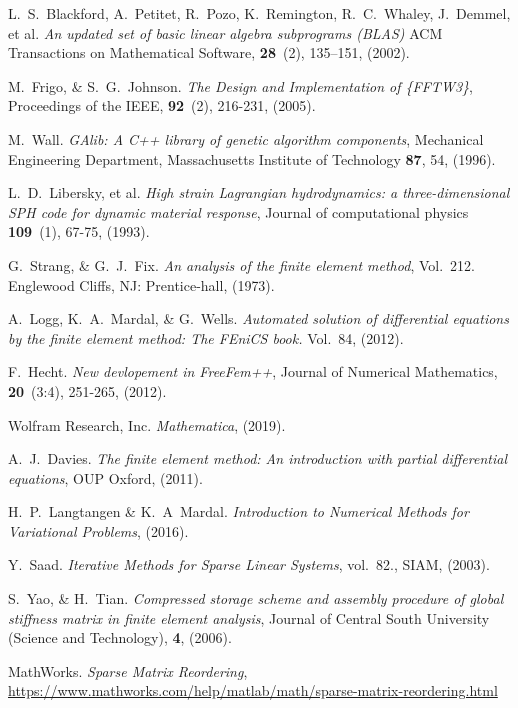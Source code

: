 \clearpage
\thispagestyle{empty}

\begin{thebibliography}{99}

 L.~S.~Blackford, A.~Petitet, R.~Pozo, K.~Remington, R.~C.~Whaley, J.~Demmel, et al. {\em An updated set of basic linear algebra subprograms (BLAS)} ACM Transactions on Mathematical Software, \textbf{28}~(2), 135–151, (2002).

 M.~Frigo, \& S.~G.~Johnson. {\em The Design and Implementation of \{FFTW3\}}, Proceedings of the IEEE, \textbf{92}~(2), 216-231, (2005).

 M.~Wall. {\em GAlib: A C++ library of genetic algorithm components},  Mechanical Engineering Department, Massachusetts Institute of Technology \textbf{87}, 54, (1996).

 L.~D.~Libersky, et al. {\em High strain Lagrangian hydrodynamics: a three-dimensional SPH code for dynamic material response}, Journal of computational physics \textbf{109}~(1), 67-75, (1993).

 G.~Strang, \& G.~J.~Fix. {\em An analysis of the finite element method}, Vol.~212. Englewood Cliffs, NJ: Prentice-hall, (1973).

 A.~Logg, K.~A.~Mardal, \& G.~Wells. {\em Automated solution of differential equations by the finite element method: The FEniCS book.} Vol.~84, (2012).

 F.~Hecht. {\em New devlopement in FreeFem++}, Journal of Numerical Mathematics, \textbf{20}~(3:4), 251-265, (2012).

 Wolfram Research, Inc. {\em Mathematica}, (2019).

 A.~J.~Davies. {\em The finite element method: An introduction with partial differential equations}, OUP Oxford, (2011).

 H.~P.~Langtangen \& K.~A~Mardal. {\em Introduction to Numerical Methods for Variational Problems}, (2016).

 Y.~Saad. {\em Iterative Methods for Sparse Linear Systems}, vol.~82., SIAM, (2003).

 S.~Yao, \& H.~Tian. {\em Compressed storage scheme and assembly procedure of global stiffness matrix in finite element analysis}, Journal of Central South University (Science and Technology), \textbf{4}, (2006).

 MathWorks. {\em Sparse Matrix Reordering}, \url{https://www.mathworks.com/help/matlab/math/sparse-matrix-reordering.html}


\end{thebibliography}
